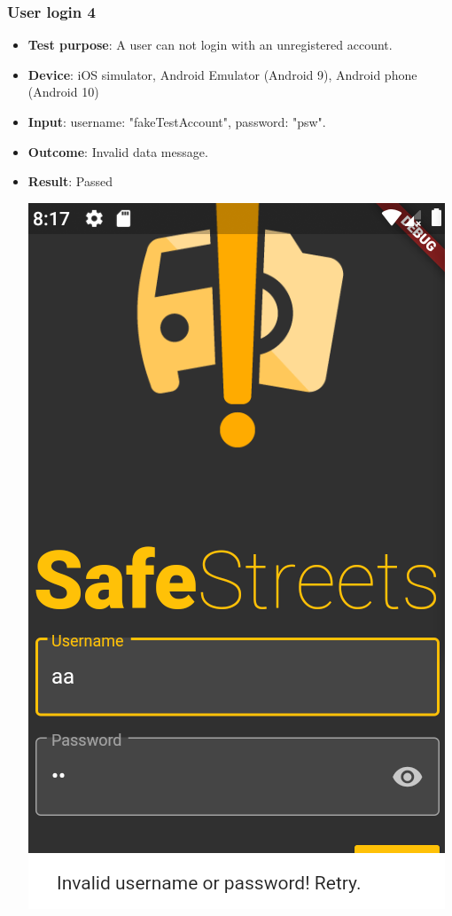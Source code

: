 \documentclass[../ATD.tex]{subfiles}
\begin{document}
    \subsubsection{User login 4}\label{subsubsec:user-login-4}
    \begin{itemize}
        \item \textbf{Test purpose}: A user can not login with an unregistered account.
        \item \textbf{Device}: iOS simulator, Android Emulator (Android 9), Android phone (Android 10)
        \item \textbf{Input}: username: "fakeTestAccount", password: "psw".
        \item \textbf{Outcome}: Invalid data message.
        \item \textbf{Result}: Passed

        \includegraphics[scale = 0.3]{assets/userNotFound.png}
    \end{itemize}
\end{document}
